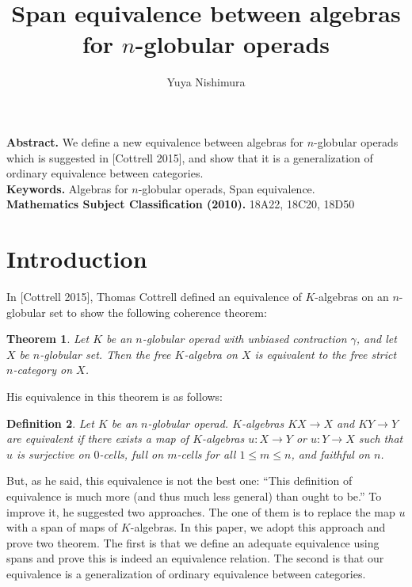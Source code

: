 \documentclass[12pt]{article}
\theoremstyle{plain}
\newtheorem{theorem}{Theorem}[section]
\newtheorem{definition}[theorem]{Definition}
\theoremstyle{definition}
\begin{document}
\title{Span equivalence between algebras for $n$-globular operads}
\author{Yuya Nishimura}
\maketitle



\begin{minipage}{118mm}{\small
{\bf Abstract.} We define a new equivalence between algebras for $n$-globular operads which is suggested in [Cottrell 2015], and show that it is a generalization of ordinary equivalence between categories.\\
{\bf Keywords.} Algebras for $n$-globular operads, Span equivalence.\\
{\bf Mathematics Subject Classification (2010).} 18A22, 18C20, 18D50
}\end{minipage}


\section{Introduction}
In [Cottrell 2015], Thomas Cottrell  defined an equivalence of $K$-algebras on an $n$-globular set to show the following coherence theorem:
\begin{theorem}
Let $K$ be an $n$-globular operad with unbiased contraction $\gamma$, and let $X$ be $n$-globular set.
Then the free $K$-algebra on $X$ is equivalent to the free strict $n$-category on $X$.
\end{theorem}
\noindent
His equivalence in this theorem is as follows:
\begin{definition}
Let $K$ be an $n$-globular operad. $K$-algebras $KX \rightarrow X$ and $KY \rightarrow Y$ are equivalent if there exists a map of $K$-algebras $u:X \rightarrow Y$ or $u:Y \rightarrow X$ such that $u$ is surjective on $0$-cells, full on $m$-cells for all $1 \leq m \leq n$, and faithful on $n$.
\end{definition}
\noindent
But, as he said, this equivalence is not the best one: ``This definition of equivalence is much more (and thus much less general) than ought to be.'' To improve it, he suggested two approaches. The one of them is to replace the map $u$ with a span of maps of $K$-algebras. In this paper, we adopt this approach and prove two theorem. The first is that we define an adequate equivalence using spans
and prove this is indeed an equivalence relation. The second is that our equivalence is a generalization of ordinary equivalence between categories.
\end{document}
